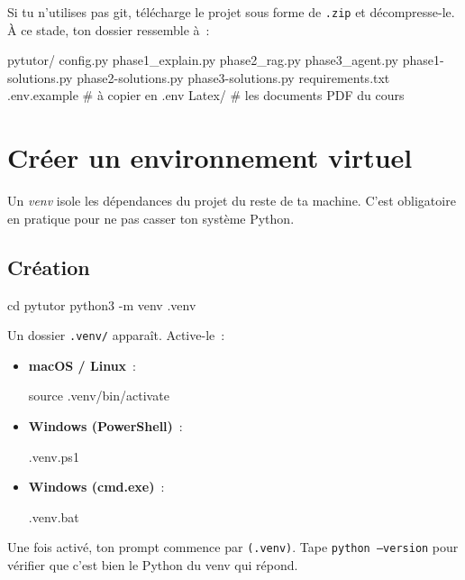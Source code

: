 \documentclass[11pt,a4paper]{article}
\begin{document}
Si tu n'utilises pas git, télécharge le projet sous forme de
\texttt{.zip} et décompresse-le. À ce stade, ton dossier ressemble
à~:

\begin{bashcode}
pytutor/
  config.py
  phase1_explain.py
  phase2_rag.py
  phase3_agent.py
  phase1-solutions.py
  phase2-solutions.py
  phase3-solutions.py
  requirements.txt
  .env.example          # à copier en .env
  Latex/                # les documents PDF du cours
\end{bashcode}

\section{Créer un environnement virtuel}
\label{sec:venv}

Un \emph{venv} isole les dépendances du projet du reste de ta
machine. C'est obligatoire en pratique pour ne pas casser ton
système Python.

\subsection{Création}

\begin{bashcode}
cd pytutor
python3 -m venv .venv
\end{bashcode}

Un dossier \texttt{.venv/} apparaît. Active-le~:

\begin{itemize}[leftmargin=*]
  \item \textbf{macOS / Linux}~:
\begin{bashcode}
source .venv/bin/activate
\end{bashcode}
  \item \textbf{Windows (PowerShell)}~:
\begin{bashcode}
.venv\Scripts\Activate.ps1
\end{bashcode}
  \item \textbf{Windows (cmd.exe)}~:
\begin{bashcode}
.venv\Scripts\activate.bat
\end{bashcode}
\end{itemize}

Une fois activé, ton prompt commence par \texttt{(.venv)}. Tape
\texttt{python --version} pour vérifier que c'est bien le Python du
venv qui répond.
\end{document}

